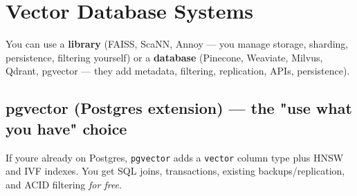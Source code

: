 \documentclass[11pt]{article}
\begin{document}
\section{Vector Database Systems}\label{vector-database-systems}

You can use a \textbf{library} (FAISS, ScaNN, Annoy --- you manage storage, sharding, persistence, filtering yourself) or a \textbf{database} (Pinecone, Weaviate, Milvus, Qdrant, pgvector --- they add metadata, filtering, replication, APIs, persistence).

\subsection{pgvector (Postgres extension) --- the "use what you have" choice}\label{pgvector-postgres-extension--the-use-what-you-have-choice}

If you\textquotesingle re already on Postgres, \texttt{pgvector} adds a \texttt{vector} column type plus HNSW and IVF indexes. You get SQL joins, transactions, existing backups/replication, and ACID filtering \emph{for free}.

\end{document}
